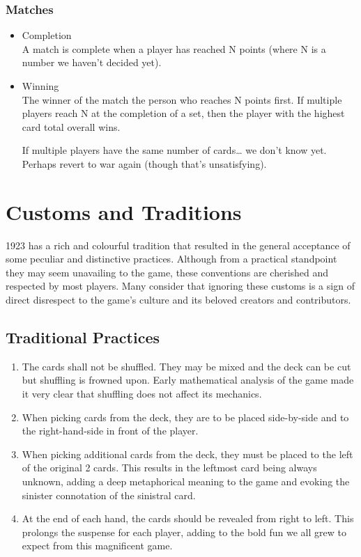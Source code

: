 \documentclass[11pt]{article}
\begin{document}
\subsubsection{Matches}
\label{sec-2-2-4}
\begin{itemize}

\item Completion\\
\label{sec-2-2-4-1}%
A match is complete when a player has reached N points (where N is a
number we haven't decided yet).


\item Winning\\
\label{sec-2-2-4-2}%
The winner of the match the person who reaches N points first. If
multiple players reach N at the completion of a set, then the player
with the highest card total overall wins. 

If multiple players have the same number of cards\ldots{} we don't know
yet. Perhaps revert to war again (though that's unsatisfying).

\end{itemize} %
\section{Customs and Traditions}
\label{sec-3}


1923 has a rich and colourful tradition that resulted in the general acceptance
of some peculiar and distinctive practices. Although from a practical standpoint
they may seem unavailing to the game, these conventions are cherished and
respected by most players. Many consider that ignoring these customs is a sign
of direct disrespect to the game's culture and its beloved creators and
contributors.
\subsection{Traditional Practices}
\label{sec-3-1}

\begin{enumerate}
\item The cards shall not be shuffled. They may be mixed and the deck can be cut
   but shuffling is frowned upon. Early mathematical analysis of the game made
   it very clear that shuffling does not affect its mechanics.
\item When picking cards from the deck, they are to be placed side-by-side and to
   the right-hand-side in front of the player.
\item When picking additional cards from the deck, they must be placed to the left
   of the original 2 cards. This results in the leftmost card being always
   unknown, adding a deep metaphorical meaning to the game and evoking the
   sinister connotation of the sinistral card.
\item At the end of each hand, the cards should be revealed from right to left.
   This prolongs the suspense for each player, adding to the bold fun we all
   grew to expect from this magnificent game.
\end{enumerate}
\end{document}
